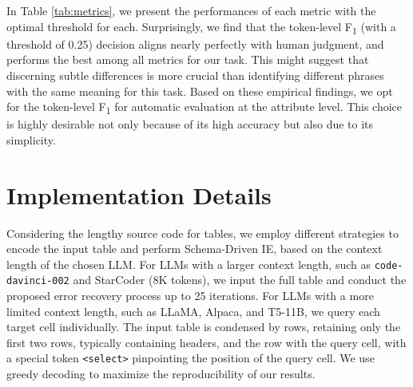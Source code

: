 \documentclass[11pt]{article}
\begin{document}
In Table \ref{tab:metrics}, we present the performances of each metric with the optimal threshold for each. Surprisingly, we find that the token-level F\textsubscript{1} (with a threshold of 0.25) decision aligns nearly perfectly with human judgment, and performs the best among all metrics for our task. This might suggest that discerning subtle differences is more crucial than identifying different phrases with the same meaning for this task. Based on these empirical findings, we opt for the token-level F\textsubscript{1} for automatic evaluation at the attribute level. This choice is highly desirable not only because of its high accuracy but also due to its simplicity.




\begin{table}[t]
\centering
{}
\caption{
Results of comparing various metrics, including token-level F\textsubscript{1}, SBERT, and BERTScore, to human judgment. 
Numbers are computed over 677 sampled attributes that are paired with gold references. The highest achieved F\textsubscript{1} scores are displayed alongside the thresholds. A complete illustration of results, sorted by thresholds, can be found in Figure \ref{fig:metrics} in Appendix.
}
\label{tab:metrics}
\end{table}


\section{Implementation Details}
\label{sec:implement_details}

Considering the lengthy source code for tables, we employ different strategies to encode the input table and perform Schema-Driven IE, based on the context length of the chosen LLM. For LLMs with a larger context length, such as \texttt{code-davinci-002} and StarCoder (8K tokens), we input the full table and conduct the proposed error recovery process up to 25 iterations. 
For LLMs with a more limited context length, such as LLaMA, Alpaca, and T5-11B, we query each target cell individually. The input table is condensed by rows, retaining only the first two rows, typically containing headers, and the row with the query cell, with a special token \texttt{<select>} pinpointing the position of the query cell. We use greedy decoding to maximize the reproducibility of our results.
\end{document}
